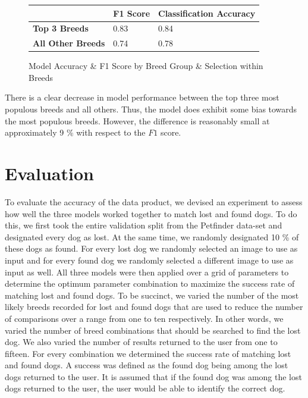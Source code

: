 \documentclass{article}
\begin{document}
\begin{figure}[]

\begin{center}

\begin{tabular}{|l|l|l|}
\hline
                          & \textbf{F1 Score} & \textbf{Classification Accuracy} \\ \hline
\textbf{Top 3 Breeds}     & 0.83        & 0.84              \\ \hline
\textbf{All Other Breeds} & 0.74        & 0.78              \\ \hline
\end{tabular}
\end{center}
\caption{Model Accuracy \& F1 Score by Breed Group & Selection within Breeds}
\label{fig:x breed score in breed}
\end{figure}

\noident  There is a clear decrease in model performance between the top three most populous breeds and all others.  Thus, the model does exhibit some bias towards the most populous breeds.  However, the difference is reasonably small at approximately 9 \% with respect to the $F1$ score.

\section{Evaluation}
To evaluate the accuracy of the data product, we devised an experiment to assess how well the three models worked together to match lost and found dogs.  To do this, we first took the entire validation split from the Petfinder data-set and designated every dog as lost.  At the same time, we randomly designated 10 \% of these dogs as found.  For every lost dog we randomly selected an image to use as input and for every found dog we randomly selected a different image to use as input as well.   All three models were then applied over a grid of parameters to determine the optimum parameter combination to maximize the success rate of matching lost and found dogs.  To be succinct, we varied the number of the most likely breeds recorded for lost and found dogs that are used to reduce the number of comparisons over a range from one to ten respectively.  In other words, we varied the number of breed combinations that should be searched to find the lost dog.  We also varied the number of results returned to the user from one to fifteen.  For every combination we determined the success rate of matching lost and found dogs.  A success was defined as the found dog being among the lost dogs returned to the user.  It is assumed that if the found dog was among the lost dogs returned to the user, the user would be able to identify the correct dog.  
\end{document}
